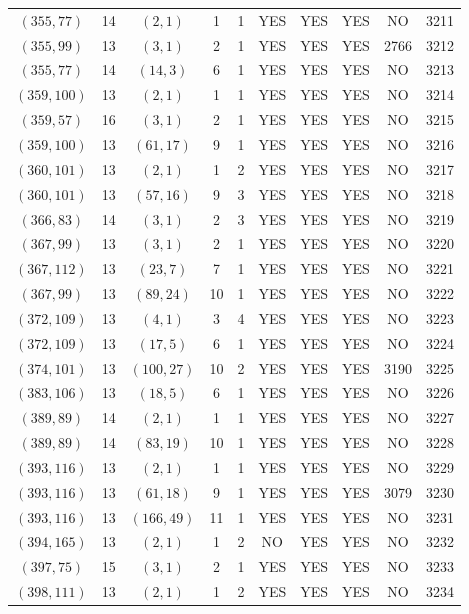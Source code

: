 \begin{longtable}{|c|c|c|c|c|c|c|c|c|c|}
$(355, 77)$ & 14 & $(2, 1)$ & 1 & 1 & YES & YES & YES & NO & 3211\\
$(355, 99)$ & 13 & $(3, 1)$ & 2 & 1 & YES & YES & YES & 2766 & 3212\\
$(355, 77)$ & 14 & $(14, 3)$ & 6 & 1 & YES & YES & YES & NO & 3213\\
$(359, 100)$ & 13 & $(2, 1)$ & 1 & 1 & YES & YES & YES & NO & 3214\\
$(359, 57)$ & 16 & $(3, 1)$ & 2 & 1 & YES & YES & YES & NO & 3215\\
$(359, 100)$ & 13 & $(61, 17)$ & 9 & 1 & YES & YES & YES & NO & 3216\\
$(360, 101)$ & 13 & $(2, 1)$ & 1 & 2 & YES & YES & YES & NO & 3217\\
$(360, 101)$ & 13 & $(57, 16)$ & 9 & 3 & YES & YES & YES & NO & 3218\\
$(366, 83)$ & 14 & $(3, 1)$ & 2 & 3 & YES & YES & YES & NO & 3219\\
$(367, 99)$ & 13 & $(3, 1)$ & 2 & 1 & YES & YES & YES & NO & 3220\\
$(367, 112)$ & 13 & $(23, 7)$ & 7 & 1 & YES & YES & YES & NO & 3221\\
$(367, 99)$ & 13 & $(89, 24)$ & 10 & 1 & YES & YES & YES & NO & 3222\\
$(372, 109)$ & 13 & $(4, 1)$ & 3 & 4 & YES & YES & YES & NO & 3223\\
$(372, 109)$ & 13 & $(17, 5)$ & 6 & 1 & YES & YES & YES & NO & 3224\\
$(374, 101)$ & 13 & $(100, 27)$ & 10 & 2 & YES & YES & YES & 3190 & 3225\\
$(383, 106)$ & 13 & $(18, 5)$ & 6 & 1 & YES & YES & YES & NO & 3226\\
$(389, 89)$ & 14 & $(2, 1)$ & 1 & 1 & YES & YES & YES & NO & 3227\\
$(389, 89)$ & 14 & $(83, 19)$ & 10 & 1 & YES & YES & YES & NO & 3228\\
$(393, 116)$ & 13 & $(2, 1)$ & 1 & 1 & YES & YES & YES & NO & 3229\\
$(393, 116)$ & 13 & $(61, 18)$ & 9 & 1 & YES & YES & YES & 3079 & 3230\\
$(393, 116)$ & 13 & $(166, 49)$ & 11 & 1 & YES & YES & YES & NO & 3231\\
$(394, 165)$ & 13 & $(2, 1)$ & 1 & 2 & NO & YES & YES & NO & 3232\\
$(397, 75)$ & 15 & $(3, 1)$ & 2 & 1 & YES & YES & YES & NO & 3233\\
$(398, 111)$ & 13 & $(2, 1)$ & 1 & 2 & YES & YES & YES & NO & 3234\\

\end{longtable}
